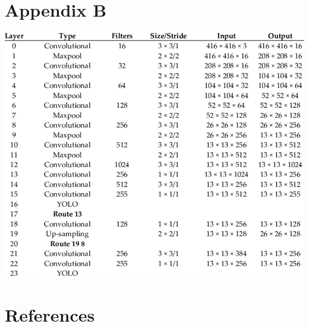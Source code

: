 \documentclass[12pt,letterpaper]{article}
\begin{document}
\pagebreak



\section*{Appendix B}
\label{sec:appb}

\medskip

\includegraphics[width=\textwidth]{assets/darknettable.png}

\pagebreak



\section*{References}
\label{sec:refer}
\end{document}
